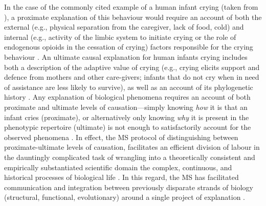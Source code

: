 In the case of the commonly cited example of a human infant crying (taken from \citep{Scott-Phillips2011,Nettle2009,Zeifman2001}), a proximate explanation of this behaviour would require an account of both the external (e.g., physical separation from the caregiver, lack of food, cold) and internal (e.g., activity of the limbic system to initiate crying or the role of endogenous opioids in the cessation of crying) factors responsible for the crying behaviour \citep[38]{Scott-Phillips2011}. An ultimate causal explanation for human infants crying includes both a description of the adaptive value of crying (e.g., crying elicits support and defence from mothers and other care-givers; infants that do not cry when in need of assistance are less likely to survive), as well as an account of its phylogenetic history \citep{Mayr1961,Tinbergen1963}.  Any explanation of biological phenomena requires an account of both proximate and ultimate levels of causation---simply knowing \textit{how} it is that an infant cries (proximate), or alternatively only knowing \textit{why} it is present in the phenotypic repertoire (ultimate) is not enough to satisfactorily account for the observed phenomena \citep[38]{Scott-Phillips2011}.  In effect, the MS protocol of distinguishing between proximate-ultimate levels of causation, facilitates an efficient division of labour in the dauntingly complicated task of wrangling into a theoretically consistent and empirically substantiated scientific domain the complex, continuous, and historical processes of biological life \citep{Mayr1961}. In this regard, the MS has facilitated communication and integration between previously disparate strands of biology (structural, functional, evolutionary) around a single project of explanation \citep{Svensson2017}.

